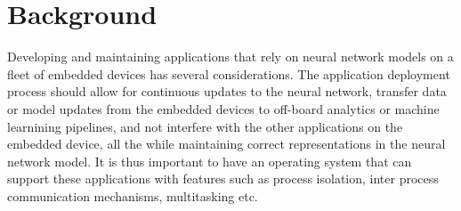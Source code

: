 




\chapter{Background}

Developing and maintaining applications that rely on neural network models on a fleet of embedded devices has several considerations. The application deployment process should allow for continuous updates to the neural network, transfer data or model updates from the embedded devices to off-board analytics or machine learnining pipelines, and not interfere with the other applications on the embedded device, all the while maintaining correct representations in the neural network model. It is thus important to have an operating system that can support these applications with features such as process isolation, inter process communication mechanisms, multitasking etc.

